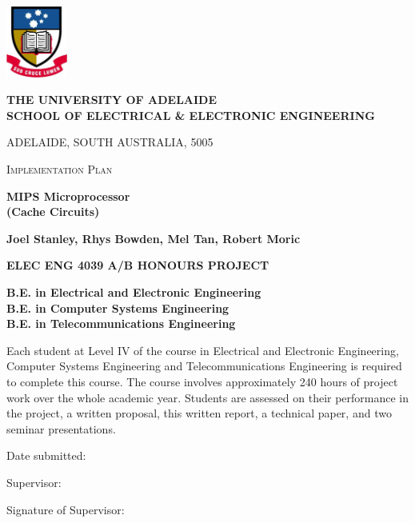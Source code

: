 \documentclass[a4paper,12pt]{article}
\begin{document}
\begin{titlepage}
\vspace{-1.5cm}
\begin{center}
\includegraphics[width=2cm]{ualogo_colour.jpg}
\vspace{1cm}

\textbf{\large THE UNIVERSITY OF ADELAIDE}\\

\textbf{SCHOOL OF ELECTRICAL \& ELECTRONIC ENGINEERING}

{\small ADELAIDE, SOUTH AUSTRALIA, 5005}

\vspace{1.5cm}
\textsc{Implementation Plan}
\vspace{1cm}

\textbf{\LARGE MIPS Microprocessor\\(Cache Circuits)}

\vspace{1cm}
\textbf{Joel Stanley, Rhys Bowden, Mel Tan, Robert Moric}

\vspace{4cm}
\textbf{\large ELEC ENG 4039 A/B HONOURS PROJECT}

\vspace{1ex}
\setlength{\linespread}{1}
\textbf{B.E. in Electrical and Electronic Engineering\\
B.E. in Computer Systems Engineering\\
B.E. in Telecommunications Engineering\\}
\end{center}

\vfill
Each student at Level IV of the course in Electrical and
Electronic Engineering, Computer Systems Engineering and
Telecommunications Engineering is required to complete this course.
The course involves approximately 240 hours of project work over the
whole academic year.  Students are assessed on their performance in
the project, a written proposal, this written report, a technical
paper, and two seminar presentations.

\vspace{1cm}
Date submitted:

\vspace{1ex}
Supervisor:

\vspace{1ex}
Signature of Supervisor:
\end{titlepage}
\end{document}
